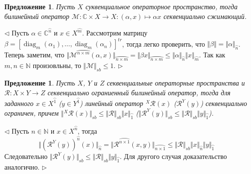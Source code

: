 \documentclass[12pt]{article}
\newtheorem{proposition}[theorem]{Предложение}
\newenvironment{proof}{\par $\triangleleft$}{$\triangleright$}
\begin{document}
\begin{proposition}\label{PrScalMultSB}
Пусть $X$ суквенциальное операторное пространство, тогда билинейный оператор $\mathcal{M}:\mathbb{C}\times X\to X:(\alpha, x)\mapsto \alpha x$ секвенциально сжимающий.
\end{proposition}
\begin{proof}
Пусть $\alpha\in\mathbb{C}^{\wideparen{n}}$ и $x\in X^{\wideparen{m}}$. Рассмотрим матрицу $\beta=[\operatorname{diag}_m(\alpha_1),\ldots,\operatorname{diag}_m(\alpha_n)]^{tr}$, тогда легко проверить, что $\Vert\beta\Vert=\Vert\alpha\Vert_{\wideparen{n}}$. Теперь заметим, что $\Vert\mathcal{M}^{\wideparen{n\times m}}(\alpha, x)\Vert_{\wideparen{n\times m}}
=\Vert\beta x\Vert_{\wideparen{n\times m}}
\leq\Vert\alpha\Vert_{\wideparen{n}}\Vert x\Vert_{\wideparen{m}}$. Так как $m,n\in\mathbb{N}$ произовльны, то $\Vert\mathcal{M}\Vert_{sb}\leq 1$.
\end{proof}

\begin{proposition}\label{PrRestrOfSBBilOpIsSB}
Пусть $X$, $Y$ и $Z$ секвенциальные операторные пространства и $\mathcal{R}:X\times Y\to Z$ секвенциально ограниенный билинейный оператор, тогда для заданного $x\in X^{\wideparen{1}}$ ($y\in Y^{\wideparen{1}}$) линейный оператор ${}^X\mathcal{R}(x)$ ($\mathcal{R}^Y(y)$) секвенциально ограничен, причем $\Vert{}^X\mathcal{R}(x)\Vert_{sb}\leq\Vert\mathcal{R}\Vert_{sb}\Vert x\Vert_{\wideparen{1}}$ ($\Vert\mathcal{R}^Y(y)\Vert_{sb}\leq\Vert\mathcal{R}\Vert_{sb}\Vert y\Vert_{\wideparen{1}}$).
\end{proposition}
\begin{proof}
Пусть $n\in\mathbb{N}$ и $x\in X^{\wideparen{n}}$, тогда
$$
\Vert(\mathcal{R}^Y(y))^{\wideparen{n}}(x)\Vert_{\wideparen{n}}
=\Vert \mathcal{R}^{\wideparen{n\times 1}}(x,y)\Vert_{\wideparen{n\times 1}}
\leq\Vert \mathcal{R}\Vert_{sb}\Vert x\Vert_{\wideparen{n}}\Vert y\Vert_{\wideparen{1}}
$$
Следовательно $\Vert\mathcal{R}^Y(y)\Vert_{sb}\leq\Vert\mathcal{R}\Vert_{sb}\Vert y\Vert_{\wideparen{1}}$. Для другого случая доказательство аналогично. 
\end{proof}
\end{document}
